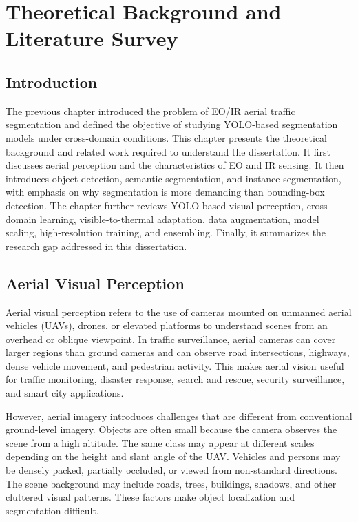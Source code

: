 \chapter{Theoretical Background and Literature Survey}

\section{Introduction}

The previous chapter introduced the problem of EO/IR aerial traffic segmentation and defined the objective of studying YOLO-based segmentation models under cross-domain conditions. This chapter presents the theoretical background and related work required to understand the dissertation. It first discusses aerial perception and the characteristics of EO and IR sensing. It then introduces object detection, semantic segmentation, and instance segmentation, with emphasis on why segmentation is more demanding than bounding-box detection. The chapter further reviews YOLO-based visual perception, cross-domain learning, visible-to-thermal adaptation, data augmentation, model scaling, high-resolution training, and ensembling. Finally, it summarizes the research gap addressed in this dissertation.

\section{Aerial Visual Perception}

Aerial visual perception refers to the use of cameras mounted on unmanned aerial vehicles (UAVs), drones, or elevated platforms to understand scenes from an overhead or oblique viewpoint. In traffic surveillance, aerial cameras can cover larger regions than ground cameras and can observe road intersections, highways, dense vehicle movement, and pedestrian activity. This makes aerial vision useful for traffic monitoring, disaster response, search and rescue, security surveillance, and smart city applications.

However, aerial imagery introduces challenges that are different from conventional ground-level imagery. Objects are often small because the camera observes the scene from a high altitude. The same class may appear at different scales depending on the height and slant angle of the UAV. Vehicles and persons may be densely packed, partially occluded, or viewed from non-standard directions. The scene background may include roads, trees, buildings, shadows, and other cluttered visual patterns. These factors make object localization and segmentation difficult.

